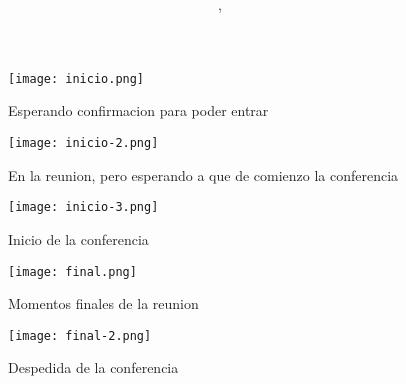 \documentclass{article}
\author{\nombre , \carnet}
\title{\textbf{\Huge\titulo}}
\begin{document}
\maketitle

\begin{figure}[h]
        \texttt{[image: inicio.png]}
		 \caption{Esperando confirmacion para poder entrar}
\end{figure}	
\pagebreak
\begin{figure}[h]
        \texttt{[image: inicio-2.png]}
		 \caption{En la reunion, pero esperando a que
		 de comienzo la conferencia}
\end{figure}
\pagebreak

\begin{figure}[h]
        \texttt{[image: inicio-3.png]}
		 \caption{Inicio de la conferencia}
\end{figure}

\begin{figure}[h]
        \texttt{[image: final.png]}
		 \caption{Momentos finales de la reunion}
\end{figure}
\pagebreak

\begin{figure}[h]
        \texttt{[image: final-2.png]}
		 \caption{Despedida de la conferencia}
\end{figure}
\end{document}
